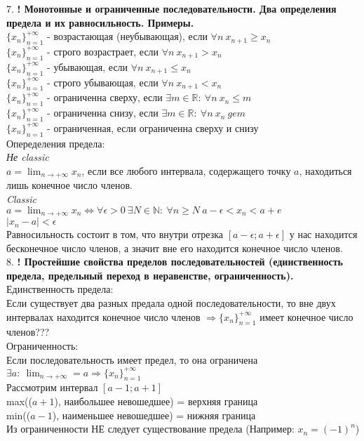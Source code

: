 \documentclass[12pt]{article}
\begin{document}
7. \textbf{! Монотонные и ограниченные последовательности. Два определения предела и их равносильность. Примеры.}\\
$\{x_n\}_{n=1}^{+\infty}$ - возрастающая (неубывающая), если $\forall n\ x_{n+1} \ge x_n$\\
$\{x_n\}_{n=1}^{+\infty}$ - строго возрастрает, если $\forall n\ x_{n+1} > x_n$\\
$\{x_n\}_{n=1}^{+\infty}$ - убывающая, если $\forall n\ x_{n+1} \le x_n$\\
$\{x_n\}_{n=1}^{+\infty}$ - строго убывающая, если $\forall n\ x_{n+1} < x_n$\\
$\{x_n\}_{n=1}^{+\infty}$ - ограниченна сверху, если $\exists m \in \mathbb{R}:\ \forall n\ x_n \le m$\\
$\{x_n\}_{n=1}^{+\infty}$ - ограниченна снизу, если $\exists m \in \mathbb{R}:\ \forall n\ x_n \ ge m$\\
$\{x_n\}_{n=1}^{+\infty}$ - ограниченная, если ограниченна сверху и снизу\\
Опеределения предела:\\
\textit{Не classic}\\
$a = \lim_{n \rightarrow +\infty}x_n$, если  все любого интервала, содержащего точку $a$, находиться лишь конечное число членов.\\
\textit{Classic}\\
$a = \lim_{n \rightarrow +\infty}x_n \Leftrightarrow \forall \epsilon > 0\ \exists N \in \mathbb{N}:\ \forall n \ge N\ a - \epsilon < x_n < a + e$\\
$|x_n - a| < \epsilon$\\
Равносильность состоит в том, что внутри отрезка $[a-\epsilon; a+\epsilon]$ у нас находится бесконечное число членов, а значит вне его находится конечное число членов.\\

8. \textbf{! Простейшие свойства пределов последовательностей (единственность предела, предельный переход в неравенстве, ограниченность).}
Единственность предела:\\
Если существует два разных предала одной последовательности, то вне двух интервалах находится конечное число членов $\Rightarrow\{x_n\}_{n=1}^{+\infty}$ имеет конечное число членов???\\

Ограниченность:\\
Если последовательность имеет предел, то она ограничена\\
$\exists a:\ \lim_{n \rightarrow +\infty} = a \Rightarrow \{x_n\}_{n=1}^{+\infty}$\\
Рассмотрим интервал $[a-1; a+1]$\\
max(($a+1$), наибольшее невошедшее) = верхняя граница\\
min(($a-1$), наименьшее невошедшее) = нижняя граница\\
Из ограниченности НЕ следует существование предела (Например: $x_n = (-1)^n$)\\
\end{document}
